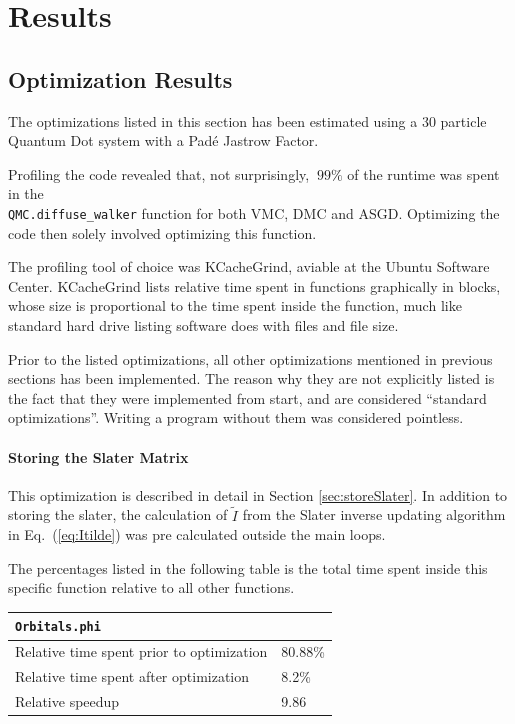 \chapter{Results}

\section{Optimization Results}

The optimizations listed in this section has been estimated using a $30$ particle Quantum Dot system with a Padé Jastrow Factor.

Profiling the code revealed that, not surprisingly, $~99\%$ of the runtime was spent in the \\\verb+QMC.diffuse_walker+ function for both VMC, DMC and ASGD. Optimizing the code then solely involved optimizing this function. 

The profiling tool of choice was KCacheGrind, aviable at the Ubuntu Software Center. KCacheGrind lists relative time spent in functions graphically in blocks, whose size is proportional to the time spent inside the function, much like standard hard drive listing software does with files and file size.

Prior to the listed optimizations, all other optimizations mentioned in previous sections has been implemented. The reason why they are not explicitly listed is the fact that they were implemented from start, and are considered ``standard optimizations''. Writing a program without them was considered pointless. 

\subsubsection{Storing the Slater Matrix}

This optimization is described in detail in Section \ref{sec:storeSlater}. In addition to storing the slater, the calculation of $\tilde I$ from the Slater inverse updating algorithm in Eq.~(\ref{eq:Itilde}) was pre calculated outside the main loops.

The percentages listed in the following table is the total time spent inside this specific function relative to all other functions. 

\begin{tabular}{ll}
 \verb+Orbitals.phi+ & \\
 \hline\hline
 Relative time spent prior to optimization & 80.88\% \\
 Relative time spent after optimization    & 8.2\% \\
 \hline
 Relative speedup                          & 9.86
\end{tabular}

